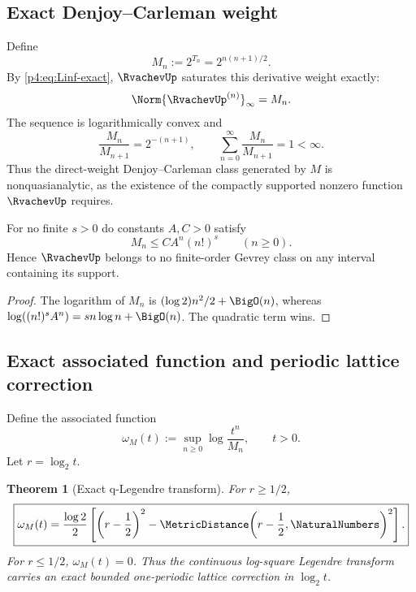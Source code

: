 \documentclass[11pt,oneside]{article}
\newtheorem{theorem}{Theorem}[section]
\theoremstyle{definition}
\theoremstyle{remark}
\begin{document}
\subsection{Exact Denjoy--Carleman weight}

Define
\begin{equation}
 M_n:=2^{T_n}=2^{n(n+1)/2}.
 \label{p4:eq:Mn}
\end{equation}
By \eqref{p4:eq:Linf-exact}, $\RvachevUp$ saturates this derivative weight exactly:
\begin{equation}
 \Norm{\RvachevUp^{(n)}}_\infty=M_n.
 \label{p4:eq:saturates-Mn}
\end{equation}
The sequence is logarithmically convex and
\begin{equation}
 \frac{M_n}{M_{n+1}}=2^{-(n+1)},
 \qquad
 \sum_{n=0}^{\infty}\frac{M_n}{M_{n+1}}=1<\infty.
 \label{p4:eq:nonquasianalytic-sum}
\end{equation}
Thus the direct-weight Denjoy--Carleman class generated by $M$ is nonquasianalytic, as the
existence of the compactly supported nonzero function $\RvachevUp$ requires.

\begin{proposition}
\label{p4:prop:not-Gevrey}
For no finite $s>0$ do constants $A,C>0$ satisfy
\begin{equation}
 M_n\leq CA^n(n!)^s\qquad(n\geq0).
 \label{p4:eq:no-Gevrey-bound}
\end{equation}
Hence $\RvachevUp$ belongs to no finite-order Gevrey class on any interval containing its support.
\end{proposition}

\begin{proof}
The logarithm of $M_n$ is $(\log2)n^2/2+\BigO(n)$, whereas
$\log((n!)^sA^n)=sn\log n+\BigO(n)$.  The quadratic term wins.
\end{proof}

\subsection{Exact associated function and periodic lattice correction}

Define the associated function
\begin{equation}
 \omega_M(t):=\sup_{n\geq0}\log\frac{t^n}{M_n},
 \qquad t>0.
 \label{p4:eq:associated-function}
\end{equation}
Let $r=\log_2t$.

\begin{theorem}[Exact q-Legendre transform]
\label{p4:thm:q-Legendre}
For $r\geq1/2$,
\begin{equation}
 \boxed{
 \omega_M(t)=\frac{\log2}{2}
 \left[
 \left(r-\frac12\right)^2
 -\MetricDistance\!\left(r-\frac12,\NaturalNumbers\right)^2
 \right].}
 \label{p4:eq:q-Legendre}
\end{equation}
For $r\leq1/2$, $\omega_M(t)=0$.  Thus the continuous log-square Legendre transform carries
an exact bounded one-periodic lattice correction in $\log_2t$.
\end{theorem}
\end{document}
